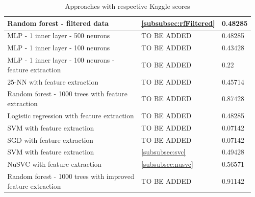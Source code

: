 \documentclass[a4paper, 11pt, oneside]{article}
\begin{document}
\begin{table}[H]
\begin{tabular}{|l|l|l|}
Random forest - filtered data                               & \ref{subsubsec:rfFiltered}                   & 0.48285                                    \\ \hline
MLP - 1 inner layer - 500 neurons                           & TO BE ADDED                                  & 0.48285                                    \\ \hline
MLP - 1 inner layer - 100 neurons                           & TO BE ADDED                                  & 0.43428                                    \\ \hline
MLP - 1 inner layer - 100 neurons - feature extraction      & TO BE ADDED                                  & 0.22                                       \\ \hline
25-NN with feature extraction                               & TO BE ADDED                                  & 0.45714                                    \\ \hline
Random forest - 1000 trees with feature extraction          & TO BE ADDED                                  & 0.87428                                    \\ \hline
Logistic regression with feature extraction                 & TO BE ADDED                                  & 0.48285                                    \\ \hline
SVM with feature extraction                                 & TO BE ADDED                                  & 0.07142                                    \\ \hline
SGD with feature extraction                                 & TO BE ADDED                                  & 0.07142                                    \\ \hline
SVM with feature extraction                                 & \ref{subsubsec:svc}                          & 0.49428                                    \\ \hline
NuSVC with feature extraction                               & \ref{subsubsec:nusvc}                        & 0.56571                                    \\ \hline
Random forest - 1000 trees with improved feature extraction & TO BE ADDED                                  & 0.91142                                    \\ \hline
\end{tabular}
\caption{Approaches with respective Kaggle scores}
\end{table}

\end{document}
